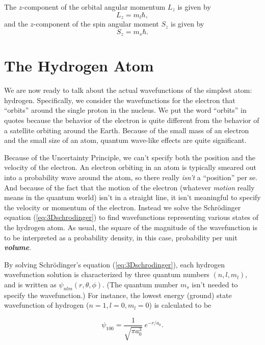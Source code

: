 The $z$-component of the orbital angular momentum $L_z$ is
given by
\begin{equation}
\label{eq:Lcomponent}
L_z = m_l \hbar  ,
\end{equation}
and the $z$-component of the spin angular moment $S_z$ is given by
\begin{equation}
\label{eq:Scomponent}
S_z = m_s \hbar .
\end{equation}

\section{The Hydrogen Atom}

We are now ready to talk about the actual wavefunctions of the
simplest atom: hydrogen.  Specifically, we consider the wavefunctions
for the electron that ``orbits'' around the single proton in the
nucleus.  We put the word ``orbits'' in quotes because the behavior of
the electron is quite different from the behavior of a satellite
orbiting around the Earth. Because of the small mass of an electron
and the small size of an atom, quantum wave-like effects are quite
significant.

Because of the Uncertainty Principle, we can't specify both the
position and the velocity of the electron. An electron orbiting in an
atom is typically smeared out into a probability wave around the atom,
so there really {\it isn't\/} a ``position'' per se.  And because of
the fact that the motion of the electron (whatever {\it motion\/}
really means in the quantum world) isn't in a straight line, it isn't
meaningful to specify the velocity or momentum of the
electron. Instead we solve the Schr\"{o}dinger equation
(\ref{eq:3Dschrodinger}) to find wavefunctions representing various
states of the hydrogen atom.  As usual, the square of the magnitude of
the wavefunction is to be interpreted as a probability density, in
this case, probability per unit {\bf {\em volume}}.

By solving Schr\"{o}dinger's equation (\ref{eq:3Dschrodinger}), each
hydrogen wavefunction solution is characterized by three quantum
numbers $\left(n, l, m_l\right)$, and is written as
$\psi_{nlm}(r,\theta,\phi)$.  (The quantum number $m_s$ isn't needed
to specify the wavefunction.)  For instance, the lowest energy
(ground) state wavefunction of hydrogen ($n=1, l=0, m_l=0$) is
calculated to be

\begin{equation}
\psi_{100} = \frac{1}{\sqrt{\pi a_0^3}}\ e^{-r/a_0} .
\label{eq:H100}
\end{equation}

